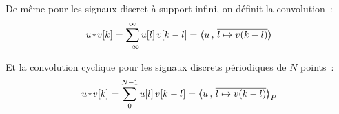De même pour les signaux discret à support infini, on définit la convolution~:
\begin{equation}
  u\!\ast\! v[k] = \sum\limits_{-\infty}^{\infty}{u[l]\,v[k-l]} = \langle\!\!\langle u\,,\,\overline{l\mapsto v(k-l)}\rangle\!\!\rangle
\end{equation}

Et la convolution cyclique pour les signaux discrets périodiques de $N$ points~:
\begin{equation}
  u\!\ast\! v[k] = \sum\limits_{0}^{N-1}{u[l]\,v[k-l]} = \langle\!\!\langle u\,,\,\overline{l\mapsto v(k-l)}{\rangle\!\!\rangle}_P
\end{equation}


